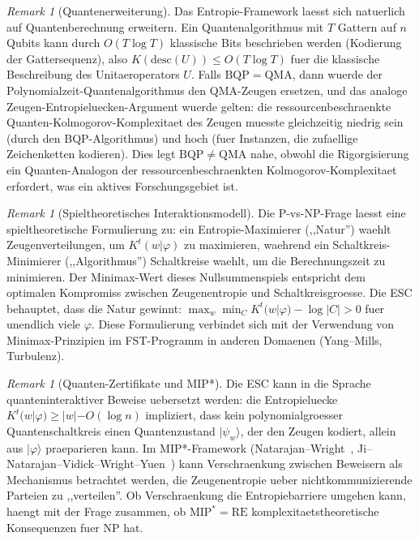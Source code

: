 \documentclass[aps,prd,twocolumn,superscriptaddress,nofootinbib]{revtex4-2}
\theoremstyle{definition}
\theoremstyle{remark}
\newtheorem{remark}[theorem]{Remark}
\begin{document}
\begin{remark}[Quantenerweiterung]
\label{rem:quantum}
Das Entropie-Framework laesst sich natuerlich auf Quantenberechnung erweitern. Ein Quantenalgorithmus mit $T$ Gattern auf $n$ Qubits kann durch $O(T \log T)$ klassische Bits beschrieben werden (Kodierung der Gattersequenz), also $K(\mathrm{desc}(U)) \leq O(T \log T)$ fuer die klassische Beschreibung des Unitaeroperators $U$. Falls $\mathrm{BQP} = \mathrm{QMA}$, dann wuerde der Polynomialzeit-Quantenalgorithmus den QMA-Zeugen ersetzen, und das analoge Zeugen-Entropieluecken-Argument wuerde gelten: die ressourcenbeschraenkte Quanten-Kolmogorov-Komplexitaet des Zeugen muesste gleichzeitig niedrig sein (durch den BQP-Algorithmus) und hoch (fuer Instanzen, die zufaellige Zeichenketten kodieren). Dies legt $\mathrm{BQP} \neq \mathrm{QMA}$ nahe, obwohl die Rigorgisierung ein Quanten-Analogon der ressourcenbeschraenkten Kolmogorov-Komplexitaet erfordert, was ein aktives Forschungsgebiet ist.
\end{remark}

\begin{remark}[Spieltheoretisches Interaktionsmodell]
\label{rem:game-theoretic}
Die P-vs-NP-Frage laesst eine spieltheoretische Formulierung zu: ein Entropie-Maximierer (,,Natur'') waehlt Zeugenverteilungen, um $K^t(w|\varphi)$ zu maximieren, waehrend ein Schaltkreis-Minimierer (,,Algorithmus'') Schaltkreise waehlt, um die Berechnungszeit zu minimieren. Der Minimax-Wert dieses Nullsummenspiels entspricht dem optimalen Kompromiss zwischen Zeugenentropie und Schaltkreisgroesse. Die ESC behauptet, dass die Natur gewinnt: $\max_w \min_C K^t(w|\varphi) - \log |C| > 0$ fuer unendlich viele $\varphi$. Diese Formulierung verbindet sich mit der Verwendung von Minimax-Prinzipien im FST-Programm in anderen Domaenen (Yang--Mills, Turbulenz).
\end{remark}

\begin{remark}[Quanten-Zertifikate und MIP*]
\label{rem:quantum-certificates}
Die ESC kann in die Sprache quanteninteraktiver Beweise uebersetzt werden: die Entropieluecke $K^t(w|\varphi) \geq |w| - O(\log n)$ impliziert, dass kein polynomialgroesser Quantenschaltkreis einen Quantenzustand $|\psi_w\rangle$, der den Zeugen kodiert, allein aus $|\varphi\rangle$ praeparieren kann. Im MIP*-Framework (Natarajan--Wright~\cite{NatarajanWright2019}, Ji--Natarajan--Vidick--Wright--Yuen~\cite{JiNatarajanVidickWrightYuen2021}) kann Verschraenkung zwischen Beweisern als Mechanismus betrachtet werden, die Zeugenentropie ueber nichtkommunizierende Parteien zu ,,verteilen''. Ob Verschraenkung die Entropiebarriere umgehen kann, haengt mit der Frage zusammen, ob $\mathrm{MIP}^* = \mathrm{RE}$ komplexitaetstheoretische Konsequenzen fuer NP hat.
\end{remark}
\end{document}
